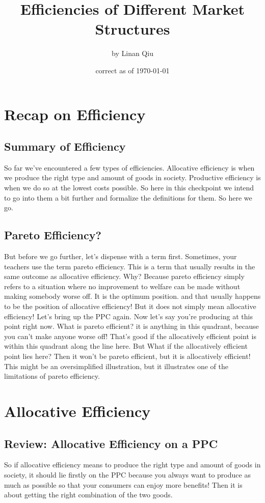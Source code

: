 \documentclass[DIV=calc,11pt,parskip,numbers=noenddot]{scrartcl} %
\title{Efficiencies of Different Market Structures}
\author{\large by Linan Qiu}
\date{\small correct as of \today}
\begin{document}
\maketitle
\tableofcontents
\section{Recap on Efficiency}
\subsection{Summary of Efficiency}
So far we’ve encountered a few types of efficiencies. Allocative efficiency is when we produce the right type and amount of goods in society. Productive efficiency is when we do so at the lowest costs possible. So here in this checkpoint we intend to go into them a bit further and formalize the definitions for them. So here we go.
\subsection{Pareto Efficiency?}
But before we go further, let’s dispense with a term first. Sometimes, your teachers use the term pareto efficiency. This is a term that usually results in the same outcome as allocative efficiency. Why? Because pareto efficiency simply refers to a situation where no improvement to welfare can be made without making somebody worse off. It is the optimum position. and that usually happens to be the position of allocative efficiency! But it does not simply mean allocative efficiency! Let’s bring up the PPC again. Now let’s say you’re producing at this point right now. What is pareto efficient? it is anything in this quadrant, because you can’t make anyone worse off! That’s good if the allocatively efficient point is within this quadrant along the line here. But What if the allocatively efficient point lies here? Then it won’t be pareto efficient, but it is allocatively efficient! This might be an oversimplified illustration, but it illustrates one of the limitations of pareto efficiency.
\newpage
\section{Allocative Efficiency}
\subsection{Review: Allocative Efficiency on a PPC}
So if allocative efficiency means to produce the right type and amount of goods in society, it should lie firstly on the PPC because you always want to produce as much as possible so that your consumers can enjoy more benefits! Then it is about getting the right combination of the two goods. 
\end{document}

